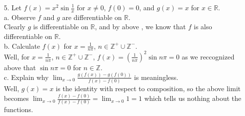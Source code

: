 \documentclass[12pt]{article}
\begin{document}
5. Let $f(x)=x^2\sin{\frac{1}{x}}$ for $x\neq0$, $f(0)=0$, and $g(x)=x$ for $x\in\mathbb{R}$.\\
a. Observe $f$ and $g$ are differentiable on $\mathbb{R}$.\\
Clearly $g$ is differentiable on $\mathbb{R}$, and by above , we know that $f$ is also differentiable on $\mathbb{R}$.\\
b. Calculate $f(x)$ for $x=\frac{1}{n\pi}$, $n\in\mathbb{Z^+}\cup\mathbb{Z^-}$.\\
Well, for $x=\frac{1}{n\pi}$, $n\in\mathbb{Z^+}\cup\mathbb{Z^-}$, $f(x)=(\frac{1}{n\pi})^2\sin{n\pi}=0$ as we reccognized above that $\sin n\pi=0$ for $n\in\mathbb{Z}$.\\
c. Explain why $\lim_{x\rightarrow0}\frac{g(f(x))-g(f(0))}{f(x)-f(0)}$ is meaningless.\\
Well, $g(x)=x$ is the identity with respect to composition, so the above limit becomes $\lim_{x\rightarrow0}\frac{f(x)-f(0)}{f(x)-f(0)}=\lim_{x\rightarrow0}1=1$ which tells us nothing about the functions.\\[20pt]
\end{document}
